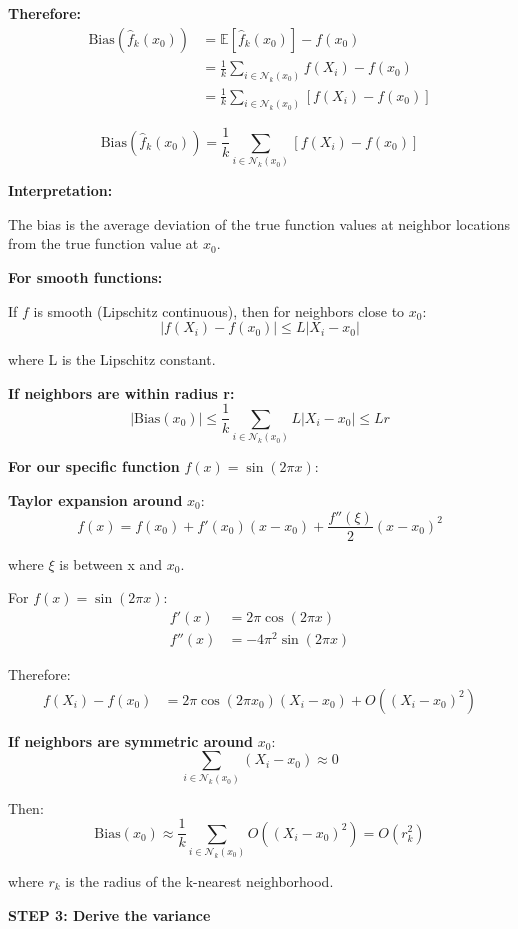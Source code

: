 \documentclass[12pt]{article}
\begin{document}
\begin{solution}
\textbf{Therefore:}
\begin{align*}
\text{Bias}(\hat{f}_k(x_0)) &= \mathbb{E}[\hat{f}_k(x_0)] - f(x_0) \\
&= \frac{1}{k}\sum_{i \in \mathcal{N}_k(x_0)} f(X_i) - f(x_0) \\
&= \frac{1}{k}\sum_{i \in \mathcal{N}_k(x_0)} [f(X_i) - f(x_0)]
\end{align*}

\[
\boxed{\text{Bias}(\hat{f}_k(x_0)) = \frac{1}{k}\sum_{i \in \mathcal{N}_k(x_0)} [f(X_i) - f(x_0)]}
\]

\textbf{Interpretation:}

The bias is the average deviation of the true function values at neighbor locations from the true function value at $x_0$.

\textbf{For smooth functions:}

If $f$ is smooth (Lipschitz continuous), then for neighbors close to $x_0$:
\[
|f(X_i) - f(x_0)| \leq L|X_i - x_0|
\]

where L is the Lipschitz constant.

\textbf{If neighbors are within radius r:}
\[
|\text{Bias}(x_0)| \leq \frac{1}{k}\sum_{i \in \mathcal{N}_k(x_0)} L|X_i - x_0| \leq Lr
\]

\textbf{For our specific function } $f(x) = \sin(2\pi x)$:

\textbf{Taylor expansion around } $x_0$:
\[
f(x) = f(x_0) + f'(x_0)(x - x_0) + \frac{f''(\xi)}{2}(x - x_0)^2
\]

where $\xi$ is between x and $x_0$.

For $f(x) = \sin(2\pi x)$:
\begin{align*}
f'(x) &= 2\pi\cos(2\pi x) \\
f''(x) &= -4\pi^2\sin(2\pi x)
\end{align*}

Therefore:
\begin{align*}
f(X_i) - f(x_0) &= 2\pi\cos(2\pi x_0)(X_i - x_0) + O((X_i - x_0)^2)
\end{align*}

\textbf{If neighbors are symmetric around } $x_0$:
\[
\sum_{i \in \mathcal{N}_k(x_0)} (X_i - x_0) \approx 0
\]

Then:
\[
\text{Bias}(x_0) \approx \frac{1}{k}\sum_{i \in \mathcal{N}_k(x_0)} O((X_i - x_0)^2) = O(r_k^2)
\]

where $r_k$ is the radius of the k-nearest neighborhood.

\textbf{STEP 3: Derive the variance}


\end{solution}
\end{document}
